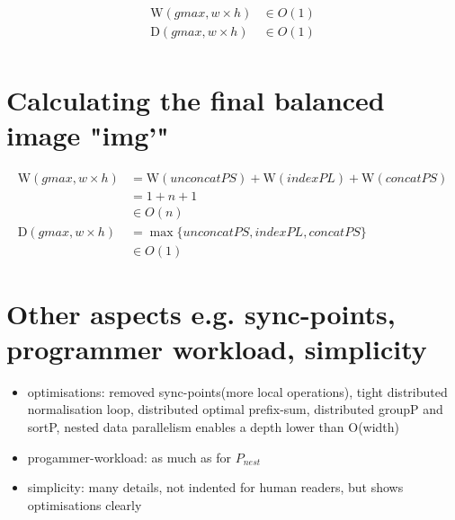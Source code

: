 \documentclass{article}
\newcommand{\ndpn}[0]{$P_{nest}$}
\newcommand{\W}[0]{\textrm{W}}
\newcommand{\D}[0]{\textrm{D}}
\begin{document}
      \begin{equation}
      \begin{split}
      \W(gmax,w \times h)
            & \in O(1) \\
      \D(gmax, w \times h)
            & \in O(1) \\
      \end{split}
      \end{equation}
      
    \section{Calculating the final balanced image "img'"}
      \begin{equation}
      \begin{split}
      \W(gmax, w \times h)
            & = \W(unconcatPS) + \W(indexPL) + \W(concatPS) \\
            & = 1 + n + 1 \\
            & \in O(n) \\
      \D(gmax, w \times h)
          & = \max \{ unconcatPS, indexPL, concatPS \} \\
          & \in O(1)
      \end{split}
      \end{equation}
      
    \section{Other aspects \small{e.g. sync-points, programmer workload, simplicity}}
      \begin{itemize}
        \item optimisations:
          removed sync-points(more local operations),
          tight distributed normalisation loop,
          distributed optimal prefix-sum,
          distributed groupP and sortP,
          nested data parallelism enables a depth lower than O(width)
        \item progammer-workload: as much as for \ndpn
        \item simplicity: many details, not indented for human readers, but shows optimisations clearly
      \end{itemize}
      
\end{document}
